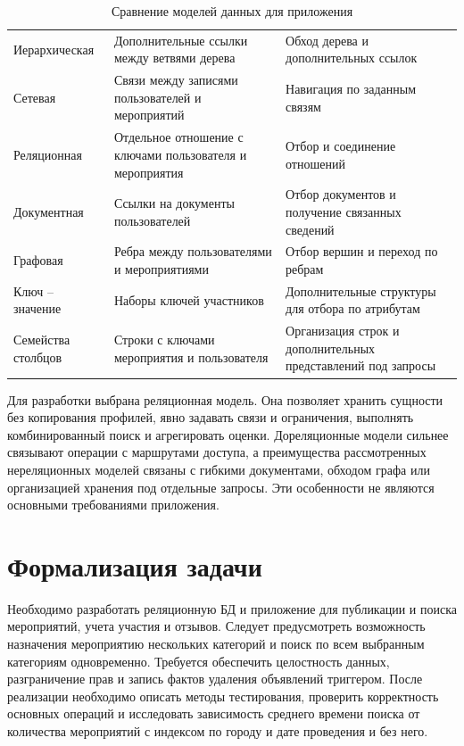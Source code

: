\begin{table}[H]
    \caption{Сравнение моделей данных для приложения}
    \label{tab:data-models}
    \small
    \begin{tabularx}{\textwidth}{|L{3.0cm}|Y|Y|}
        \hline
         &
         &
         \\
        \hline
        Иерархическая & Дополнительные ссылки между ветвями дерева & Обход дерева и дополнительных ссылок \\
        \hline
        Сетевая & Связи между записями пользователей и мероприятий & Навигация по заданным связям \\
        \hline
        Реляционная & Отдельное отношение с ключами пользователя и мероприятия & Отбор и соединение отношений \\
        \hline
        Документная & Ссылки на документы пользователей & Отбор документов и получение связанных сведений \\
        \hline
        Графовая & Ребра между пользователями и мероприятиями & Отбор вершин и переход по ребрам \\
        \hline
        Ключ -- значение & Наборы ключей участников & Дополнительные структуры для отбора по атрибутам \\
        \hline
        Семейства столбцов & Строки с ключами мероприятия и пользователя & Организация строк и дополнительных представлений под запросы \\
        \hline
    \end{tabularx}
\end{table}

Для разработки выбрана реляционная модель. Она позволяет хранить сущности без копирования профилей, явно задавать связи и ограничения, выполнять комбинированный поиск и агрегировать оценки. Дореляционные модели сильнее связывают операции с маршрутами доступа, а преимущества рассмотренных нереляционных моделей связаны с гибкими документами, обходом графа или организацией хранения под отдельные запросы. Эти особенности не являются основными требованиями приложения.

\section{Формализация задачи}

Необходимо разработать реляционную БД и приложение для публикации и поиска мероприятий, учета участия и отзывов. Следует предусмотреть возможность назначения мероприятию нескольких категорий и поиск по всем выбранным категориям одновременно. Требуется обеспечить целостность данных, разграничение прав и запись фактов удаления объявлений триггером. После реализации необходимо описать методы тестирования, проверить корректность основных операций и исследовать зависимость среднего времени поиска от количества мероприятий с индексом по городу и дате проведения и без него.

